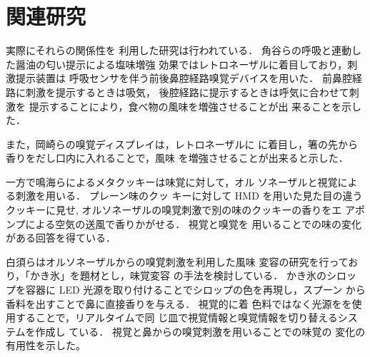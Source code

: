 \section{関連研究}

実際にそれらの関係性を
利用した研究は行われている．
角谷らの呼吸と連動した醤油の匂い提示による塩味増強
効果\cite{enmi}ではレトロネーザルに着目しており，刺激提示装置は
呼吸センサを伴う前後鼻腔経路嗅覚デバイスを用いた． 
前鼻腔経路に刺激を提示するときは吸気，
後腔経路に提示するときは呼気に合わせて刺激を
提示することにより，食べ物の風味を増強させることが出
来ることを示した．


また，岡崎らの嗅覚ディスプレイは，レトロネーザルに
に着目し，箸の先から香りをだし口内に入れることで，風味
を増強させることが出来ると示した．\cite{hasi}


一方で鳴海らによるメタクッキー\cite{narumi2}は味覚に対して，オル
ソネーザルと視覚による刺激を用いる． プレーン味のクッ
キーに対して HMD を用いた見た目の違うクッキーに見せ,
オルソネーザルの嗅覚刺激で別の味のクッキーの香りをエ
アポンプによる空気の送風で香りかがせる． 視覚と嗅覚を
用いることでの味の変化がある回答を得ている．


白須らはオルソネーザルからの嗅覚刺激を利用した風味
変容の研究を行っており，「かき氷」を題材とし，味覚変容
の手法を検討している． かき氷のシロップを容器に LED
光源を取り付けることでシロップの色を再現し，スプーン
から香料を出すことで鼻に直接香りを与える． 視覚的に着
色料ではなく光源をを使用することで，リアルタイムで同
じ皿で視覚情報と嗅覚情報を切り替えるシステムを作成し
ている． 視覚と鼻からの嗅覚刺激を用いることでの味覚の
変化の有用性を示した。\cite{fan}\cite{pomp}

